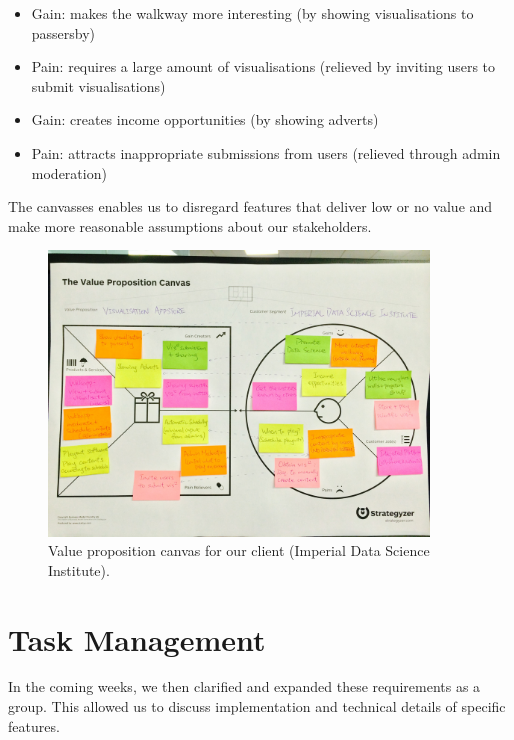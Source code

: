 \documentclass[a4paper]{article}
\begin{document}
\begin{itemize}
  \item Gain: makes the walkway more interesting
        (by showing visualisations to passersby)
  \item Pain: requires a large amount of visualisations
        (relieved by inviting users to submit visualisations)
  \item Gain: creates income opportunities
        (by showing adverts)
  \item Pain: attracts inappropriate submissions from users
        (relieved through admin moderation)
\end{itemize}


The canvasses enables us to disregard features that deliver low or no value
and make more reasonable assumptions about our stakeholders.

\begin{figure}[H]
   \begin{center}
      \includegraphics[width = 0.9\textwidth, trim = 1cm 6.5cm 1cm 4.5cm, clip]{./evaluation/value_prop_canvas.jpg}
   \end{center}
   \caption{Value proposition canvas for our client (Imperial Data
            Science Institute).}
   \label{fig:valpropcanvas}
\end{figure}



\section{Task Management}
In the coming weeks, we then clarified and expanded these requirements as 
a group. This allowed us to discuss implementation and technical details
of specific features.
\end{document}
